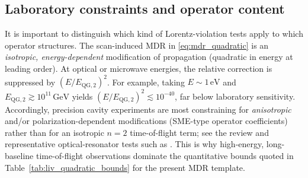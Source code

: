 \subsection{Laboratory constraints and operator content}
It is important to distinguish which kind of Lorentz-violation tests apply to which operator structures.
The scan-induced MDR in \eqref{eq:mdr_quadratic} is an \emph{isotropic, energy-dependent} modification of propagation (quadratic in energy at leading order).
At optical or microwave energies, the relative correction is suppressed by $(E/E_{\mathrm{QG},2})^2$.
For example, taking $E\sim 1\,\mathrm{eV}$ and $E_{\mathrm{QG},2}\gtrsim 10^{11}\,\mathrm{GeV}$ yields $(E/E_{\mathrm{QG},2})^2\lesssim 10^{-40}$, far below laboratory sensitivity.
Accordingly, precision cavity experiments are most constraining for \emph{anisotropic} and/or polarization-dependent modifications (SME-type operator coefficients) rather than for an isotropic $n=2$ time-of-flight term; see the review \cite{Mattingly2005} and representative optical-resonator tests such as \cite{MullerHerrmannSaenzPetersLaemmerzahl2003}.
This is why high-energy, long-baseline time-of-flight observations dominate the quantitative bounds quoted in Table~\ref{tab:liv_quadratic_bounds} for the present MDR template.
